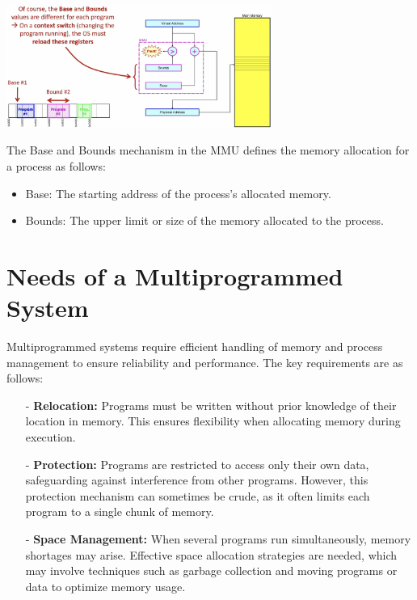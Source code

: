 \begin{center} \includegraphics[width=0.65\textwidth]{chapters/chapter3c/images/bb.png} \end{center}

The Base and Bounds mechanism in the MMU defines the memory allocation for a process as follows:

\begin{itemize} \item Base: The starting address of the process's allocated memory. \item Bounds: The upper limit or size of the memory allocated to the process. \end{itemize}

\section{Needs of a Multiprogrammed System}

Multiprogrammed systems require efficient handling of memory and process management to ensure reliability and performance. The key requirements are as follows:

\begin{itemize}
    \item[-] \textbf{Relocation:} Programs must be written without prior knowledge of their location in memory. This ensures flexibility when allocating memory during execution.

    \item[-] \textbf{Protection:} Programs are restricted to access only their own data, safeguarding against interference from other programs. However, this protection mechanism can sometimes be crude, as it often limits each program to a single chunk of memory.

    \item[-] \textbf{Space Management:} When several programs run simultaneously, memory shortages may arise. Effective space allocation strategies are needed, which may involve techniques such as garbage collection and moving programs or data to optimize memory usage.
\end{itemize}

